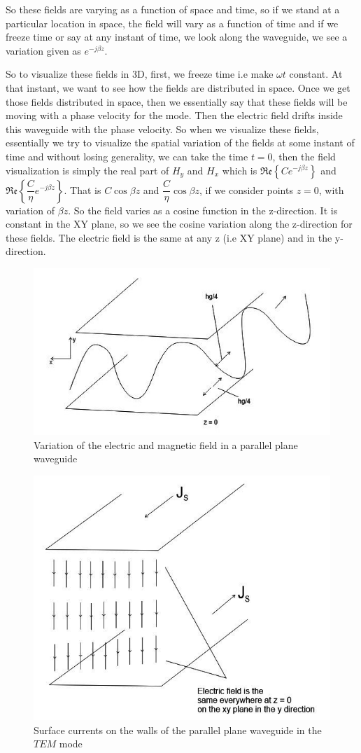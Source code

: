 So these fields are varying as a function of space and time, so if we stand at a particular location in space, the field will vary as a function of time and if we freeze time or say at any instant of time, we look along the waveguide, we see a variation given as $e^{-j\beta z}$. 

So to visualize these fields in 3D, first, we freeze time i.e make ${\omega t}$ constant. At that instant, we want to see how the fields are distributed in space. Once we get those fields distributed in space, then we essentially say that these fields will be moving with a phase velocity for the mode. Then the electric field drifts inside this waveguide with the phase velocity. So when we visualize these fields, essentially we try to visualize the spatial variation of the fields at some instant of time and without losing generality, we can take the time $t=0$, then the field visualization is simply the real part of ${H_y}$ and ${H_x}$ which is ${\mathfrak{Re}\left\{Ce^{-j\beta z}\right\}}$ and ${\mathfrak{Re}\left\{\dfrac{C}{\eta}e^{-j\beta z}\right\}}$. That is ${C\cos\beta z}$ and ${\dfrac{C}{\eta}\cos\beta z}$, if we consider points $z=0$, with variation of ${\beta z}$. So the field varies as a cosine function in the z-direction. It is constant in the XY plane, so we see the cosine variation along the z-direction for these fields. The electric field is the same at any z (i.e XY plane) and in the y-direction.
\begin{figure}[h]
\centering
\includegraphics[width=.7\linewidth]{./graphics/group4002}
\caption{Variation of the electric and magnetic field in a parallel plane waveguide}
\label{fig:group4002}
\end{figure}
\begin{figure}[h]
\centering
\includegraphics[width=.7\linewidth]{./graphics/page702}
\caption{Surface currents on the walls of the parallel plane waveguide in the $TEM$ mode}
\label{fig:page702}
\end{figure}
